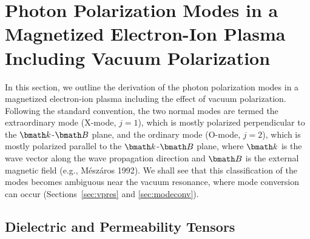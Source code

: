 \documentclass{mn2e}
\newcommand{\vecB}{{\bmath B}}
\newcommand{\veck}{{\bmath k}}
\begin{document}
\setcounter{equation}{0}
\section{Photon Polarization Modes in a Magnetized Electron-Ion Plasma
Including Vacuum Polarization}
\label{sec:polar}

In this section, we outline the derivation of the photon polarization
modes in a magnetized electron-ion plasma including the effect of
vacuum polarization.
Following the standard convention, the two normal modes are termed
the extraordinary mode (X-mode, $j = 1$), which is mostly polarized
perpendicular to the
$\veck$-$\vecB$ plane, and the ordinary mode (O-mode, $j = 2$), which
is mostly polarized parallel to the $\veck$-$\vecB$ plane,
where $\veck$ is the wave vector along the wave propagation
direction and $\vecB$ is the external magnetic field
(e.g., M\'{e}sz\'{a}ros 1992).
We shall see that this classification of the modes becomes ambiguous
near the vacuum resonance, where mode conversion can occur
(Sections~\ref{sec:vpres} and \ref{sec:modeconv}).

\subsection{Dielectric and Permeability Tensors}
\label{sec:dielectric}
\end{document}
